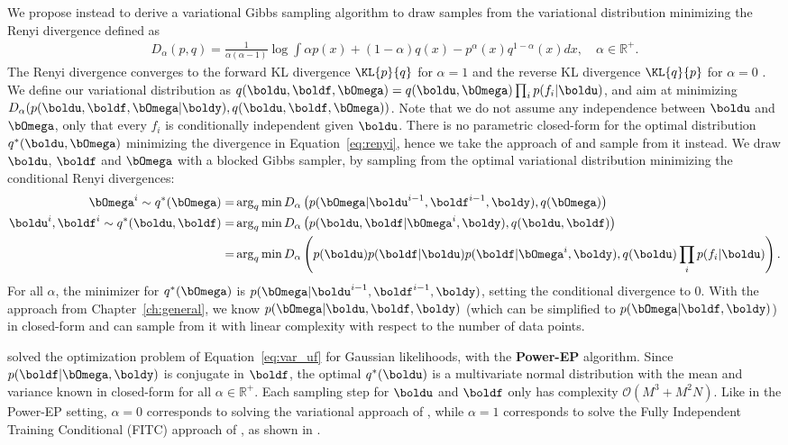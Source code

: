 We propose instead to derive a variational Gibbs sampling algorithm to draw samples from the variational distribution minimizing the Renyi divergence \cite{van2014renyi} defined as
\begin{align}
    D_\alpha(p,q) = \frac{1}{\alpha(\alpha - 1)}\log\int \alpha p(x) + (1-\alpha)q(x) - p^\alpha(x)q^{1-\alpha}(x)dx,\quad \alpha \in \mathbb{R}^+.\label{eq:renyi}
\end{align}
The Renyi divergence converges to the forward KL divergence $\KL{p}{q}$ for $\alpha=1$ and the reverse KL divergence $\KL{q}{p}$ for $\alpha=0$ \cite{van2014renyi}.
We define our variational distribution as $q(\boldu,\boldf,\bOmega) = q(\boldu,\bOmega)\prod_i p(f_i|\boldu)$, and aim at minimizing $D_\alpha(p(\boldu,\boldf,\bOmega|\boldy),q(\boldu,\boldf,\bOmega))$.
Note that we do not assume any independence between $\boldu$ and $\bOmega$, only that every $f_i$ is conditionally independent given $\boldu$.
There is no parametric closed-form for the optimal distribution $q^*(\boldu,\bOmega)$ minimizing the divergence in Equation~\eqref{eq:renyi}, hence we take the approach of \citet{hensmanMCMCVariationallySparse2015} and sample from it instead.
We draw $\boldu$, $\boldf$ and $\bOmega$ with a blocked Gibbs sampler, by sampling from the optimal variational distribution minimizing the conditional Renyi divergences:
\begin{align}
    \bOmega^i \sim q^*(\bOmega) =& \arg_q \min D_\alpha\left(p(\bOmega|\boldu^{i-1},\boldf^{i-1},\boldy),q(\bOmega)\right)\label{eq:var_omega}\\
    \boldu^i, \boldf^i \sim q^*(\boldu,\boldf) =& \arg_q \min D_\alpha\left(p(\boldu,\boldf|\bOmega^i,\boldy),q(\boldu,\boldf)\right)\nonumber\\
    =& \arg_q \min D_\alpha\left(p(\boldu)p(\boldf|\boldu)p(\boldf|\bOmega^i,\boldy),q(\boldu)\prod_i p(f_i|\boldu)\right).\label{eq:var_uf}
\end{align}
For all $\alpha$, the minimizer for $q^*(\bOmega)$ is $p(\bOmega|\boldu^{i-1},\boldf^{i-1},\boldy)$, setting the conditional divergence to 0.
With the approach from Chapter~\ref{ch:general}, we know $p(\bOmega|\boldu,\boldf,\boldy)$ (which can be simplified to $p(\bOmega|\boldf,\boldy)$) in closed-form and can sample from it with linear complexity with respect to the number of data points.

\citet{buiUnifyingFrameworkGaussian2017} solved the optimization problem of Equation~\eqref{eq:var_uf} for Gaussian likelihoods, with the \textbf{Power-EP} algorithm.
Since $p(\boldf|\bOmega,\boldy)$ is conjugate in $\boldf$, the optimal $q^*(\boldu)$ is a multivariate normal distribution with the mean and variance known in closed-form for all $\alpha \in \mathbb{R}^+$.
Each sampling step for $\boldu$ and $\boldf$ only has complexity $\mathcal{O}(M^3 + M^2N)$.
Like in the Power-EP setting, $\alpha=0$ corresponds to solving the variational approach of \citet{Titsias2009}, while $\alpha=1$ corresponds to solve the Fully Independent Training Conditional (FITC) approach of \citet{snelsonSparseGaussianProcesses2009}, as shown in \citet{buiUnifyingFrameworkGaussian2017}.

